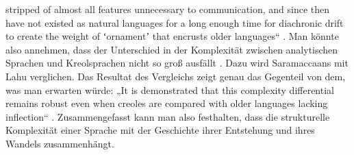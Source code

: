 stripped of almost all features unnecessary to communication, and since then have not existed as natural languages for a long enough time for diachronic drift to create the weight of ʻornamentʼ that encrusts older languages“ \citep[125]{McWhorter2001}. Man könnte also annehmen, dass der Unterschied in der Komplexität zwischen analytischen Sprachen und Kreolsprachen nicht so groß ausfällt \citep[143--144]{McWhorter2001}. Dazu wird Saramaccaans mit Lahu verglichen. Das Resultat des Vergleichs zeigt genau das Gegenteil von dem, was man erwarten würde: „It is demonstrated that this complexity differential remains robust even when creoles are compared with older languages lacking inflection“ \citep[125]{McWhorter2001}. Zusammengefasst kann man also festhalten, dass die strukturelle Komplexität einer Sprache mit der Geschichte ihrer Entstehung und ihres Wandels zusammenhängt.

